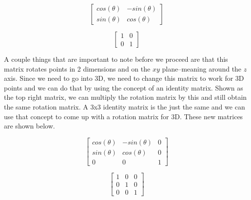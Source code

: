 \documentclass[14pt]{article}
\begin{document}
\vspace{1em}

\begin{figure}[h]
	\vspace*{1em}
	\begin{center}
		\begin{minipage}[b]{0.45\textwidth}
			\centering
			
			$$
			\begin{bmatrix}
			cos(\theta) & -sin(\theta) \\
			sin(\theta) & cos(\theta)
			\end{bmatrix}
			$$
		\end{minipage}
		\hfill
		\begin{minipage}[b]{0.45\textwidth}
			\centering
			$$
			\begin{bmatrix}
			1 & 0 \\
			0 & 1
			\end{bmatrix}			
			$$
		\end{minipage}
	\end{center}
	\vspace*{1em}
\end{figure}

\vspace{1em}

A couple things that are important to note before we proceed are that this matrix rotates points in 2 dimensions and on the $xy$ plane--meaning around the $z$ axis. Since we need to go into 3D, we need to change this matrix to work for 3D points and we can do that by using the concept of an identity matrix. Shown as the top right matrix, we can multiply the rotation matrix by this and still obtain the same rotation matrix. A 3x3 identity matrix is the just the same and we can use that concept to come up with a rotation matrix for 3D. These new matrices are shown below.

\begin{figure}[H]
	\vspace*{1em}
	\begin{center}
		\begin{minipage}[b]{0.45\textwidth}
			\centering
			
			$$
			\begin{bmatrix}
			cos(\theta) & -sin(\theta) & 0 \\
			sin(\theta) & cos(\theta) & 0 \\ 
			0 & 0 & 1
			\end{bmatrix}
			$$
		\end{minipage}
		\hfill
		\begin{minipage}[b]{0.45\textwidth}
			\centering
			$$
			\begin{bmatrix}
			1 & 0 & 0 \\
			0 & 1 & 0 \\
			0 & 0 & 1
			\end{bmatrix}			
			$$
		\end{minipage}
	\end{center}
	\vspace*{1em}
\end{figure}
\end{document}
